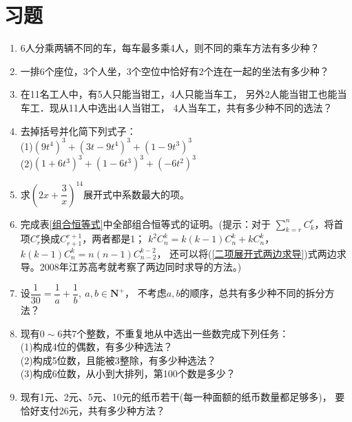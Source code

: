 \section{习题}
\begin{enumerate}[label={\textbf{\arabic*.}},leftmargin=
    \inteval{\myenumleftmargin}pt]
\item 6人分乘两辆不同的车，每车最多乘4人，则不同的乘车方法有多少种？

\item 一排6个座位，3个人坐，3个空位中恰好有2个连在一起的坐法有多少种？

\item 在11名工人中，有5人只能当钳工，4人只能当车工，
另外2人能当钳工也能当车工．现从11人中选出4人当钳工，
4人当车工，共有多少种不同的选法？

\item 去掉括号并化简下列式子：\\
(1)\q $ \left(9t^4\right)^3+\left(3t-9t^4\right)^3+
\left(1-9t^3\right)^3 $ \\
(2)\q $ \left(1+6t^3\right)^3+\left(1-6t^3\right)^3+
\left(-6t^2\right)^3 $

\item 求$ \left(2x+\dfrac{3}{x}\right)^{14} $展开式中系数最大的项。

\item 完成表\ref{组合恒等式}中全部组合恒等式的证明。(提示：对于
$ \sum\limits_{k=r}^{n} C_k^r $，将首项$ C_r^r $换成$ C_{r+1}^{r+1} $，两者都是1；
$ k^2C_n^k=k(k-1)C_n^k+kC_n^k $，$ k(k-1)C_n^k=n(n-1)C_{n-2}^{k-2} $，
还可以将(\ref{二项展开式两边求导})式两边求导。2008年江苏高考就考察了两边同时求导的方法。)

\item 设$ \dfrac{1}{30}=\dfrac{1}{a}+\dfrac{1}{b},\ a,b\in\textbf{N}^+ $，
不考虑$ a,b $的顺序，总共有多少种不同的拆分方法？

\item 现有$ 0\sim 6 $共7个整数，不重复地从中选出一些数完成下列任务：\\
(1)构成4位的偶数，有多少种选法？\\
(2)构成5位数，且能被3整除，有多少种选法？\\
(3)构成6位数，从小到大排列，第100个数是多少？

\item 现有1元、2元、5元、10元的纸币若干(每一种面额的纸币数量都足够多)，
要恰好支付26元，共有多少种方法？ 

\end{enumerate}


